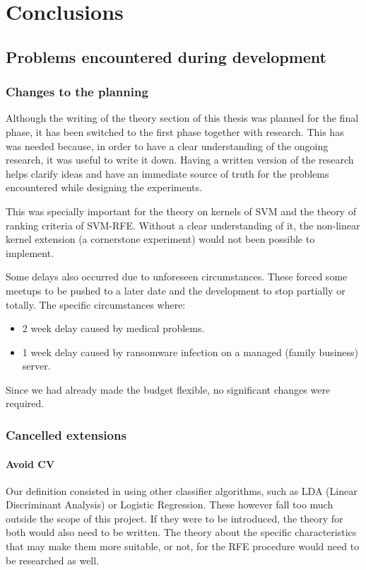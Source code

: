 
\chapter{Conclusions} %

\section{Problems encountered during development}

\subsection*{Changes to the planning}

Although the writing of the theory section of this thesis was planned for the final phase, it has been switched to the first phase together with research. This has was needed because, in order to have a clear understanding of the ongoing research, it was useful to write it down. Having a written version of the research helps clarify ideas and have an immediate source of truth for the problems encountered while designing the experiments.

This was specially important for the theory on kernels of SVM and the theory of ranking criteria of SVM-RFE. Without a clear understanding of it, the non-linear kernel extension (a cornerstone experiment) would not been possible to implement.

Some delays also occurred due to unforeseen circumstances. These forced some meetups to be pushed to a later date and the development to stop partially or totally. The specific circumstances where:

\begin{itemize}
    \item 2 week delay caused by medical problems.
    \item 1 week delay caused by ransomware infection on a managed (family business) server. 
\end{itemize}

Since we had already made the budget flexible, no significant changes were required.

\subsection*{Cancelled extensions}

\subsubsection*{Avoid CV}
Our definition consisted in using other classifier algorithms, such as LDA (Linear Discriminant Analysis) or Logistic Regression. These however fall too much outside the scope of this project. If they were to be introduced, the theory for both would also need to be written. The theory about the specific characteristics that may make them more suitable, or not, for the RFE procedure would need to be researched as well.

